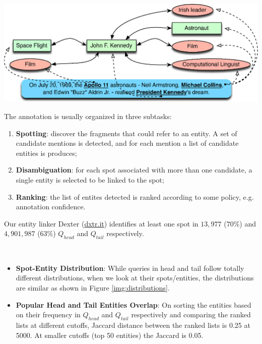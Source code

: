 \documentclass[a0,portrait,final]{a0poster}
\newcommand{\tail}[1]{$Q_{tail}${}}
\newcommand{\head}[1]{$Q_{head}${}}
\newcommand{\pbox}[3]{
	\begin{center}
	\psshadowbox[linewidth=2mm,framearc=0.1,framesep=1em,shadowsize=4mm,shadowcolor=lightgray,linecolor=#2]{
		\begin{minipage}[t][][t]{#1}{
			#3 %
		}\end{minipage}
	}
	\end{center}
}
\newlength\ptitlespace
\newcommand{\ptitle}[1]{
	\vspace{\ptitlespace}
	\pbox{0.92\columnwidth}{arancioneisti}{
		\begin{center}
		\textsc{\LARGE\bluisti{#1}} %
		\end{center}
	}
	\vspace{0.5\ptitlespace}
}
\begin{document}
\begin{multicols}{2}
\vspace{5mm}
\begin{center}
\includegraphics[width=0.92\columnwidth]{img/annotation-example.eps}
\end{center}

The annotation is usually organized in three subtasks:
\begin{enumerate}
	\item \textbf{Spotting}: discover the fragments that could refer to an entity. A set of candidate mentions is detected, and for each mention a list of candidate entities is produces;
	\item \textbf{Disambiguation}: for each spot associated with more than one candidate, a single entity is selected to be linked to the spot;
	\item \textbf{Ranking}: the list of entites detected is ranked according to some policy, e.g. annotation confidence. 
\end{enumerate}

Our entity linker Dexter (\url{dxtr.it}) identifies 
at least one spot in $13,977$ ($70\%$) and $4,901,987$ ($63\%$) \head{} and \tail{} 
respectively.

\ptitle{Analysis}
\
\begin {itemize}

	\item {\textbf{Spot-Entity Distribution}:} While queries in head and tail follow totally different distributions, when we 		look at their spots/entities, the distributions are similar as shown in Figure \ref{img:distributions}.  
	

	\item {\textbf{Popular Head and Tail Entities Overlap}:} On sorting the entities based on their frequency in \head{} 		and \tail{} respectively and comparing the ranked lists at different cutoffs, Jaccard distance between the ranked lists is 		0.25 at 5000. At smaller cutoffs (top 50 entities) the Jaccard is 0.05. 
	

\end{itemize}
\end{multicols}
\end{document}
